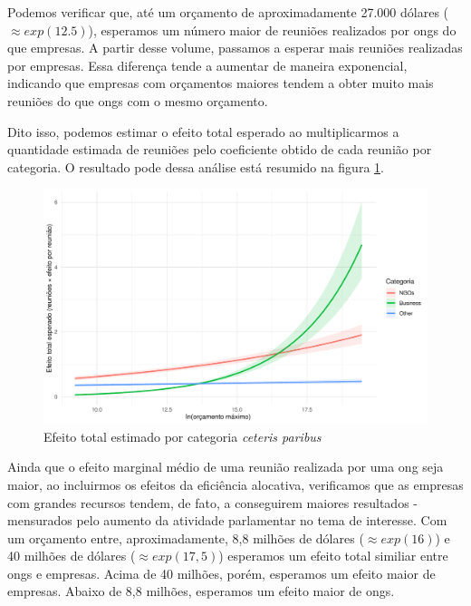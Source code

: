 Podemos verificar que, até um orçamento de aproximadamente 27.000 dólares ($\approx exp(12.5)$), esperamos um número maior de reuniões realizados por \acrshort{ong}s do que empresas. A partir desse volume, passamos a esperar mais reuniões realizadas por empresas. Essa diferença tende a aumentar de maneira exponencial, indicando que empresas com orçamentos maiores tendem a obter muito mais reuniões do que \acrshort{ong}s com o mesmo orçamento.


Dito isso, podemos estimar o efeito total esperado ao multiplicarmos a quantidade estimada de reuniões pelo coeficiente obtido de cada reunião por categoria. O resultado pode dessa análise está resumido na figura \ref{fig:h2_total_effects}.

\begin{figure}[htbp]
    \centering
    \includegraphics[width=\textwidth]{figures/h2_test/fig_total_effect_vs_budget_by_category.pdf}
    \caption{Efeito total estimado por categoria \textit{ceteris paribus}}
    \label{fig:h2_total_effects}
    \note{}
\end{figure}

Ainda que o efeito marginal médio de uma reunião realizada por uma \acrshort{ong} seja maior, ao incluirmos os efeitos da eficiência alocativa, verificamos que as empresas com grandes recursos tendem, de fato, a conseguirem maiores resultados - mensurados pelo aumento da atividade parlamentar no tema de interesse. Com um orçamento entre, aproximadamente, 8,8 milhões de dólares ($\approx exp(16)$) e 40 milhões de dólares ($\approx exp(17,5)$) esperamos um efeito total similiar entre \acrshort{ong}s e empresas. Acima de 40 milhões, porém, esperamos um efeito maior de empresas. Abaixo de 8,8 milhões, esperamos um efeito maior de \acrshort{ong}s.

